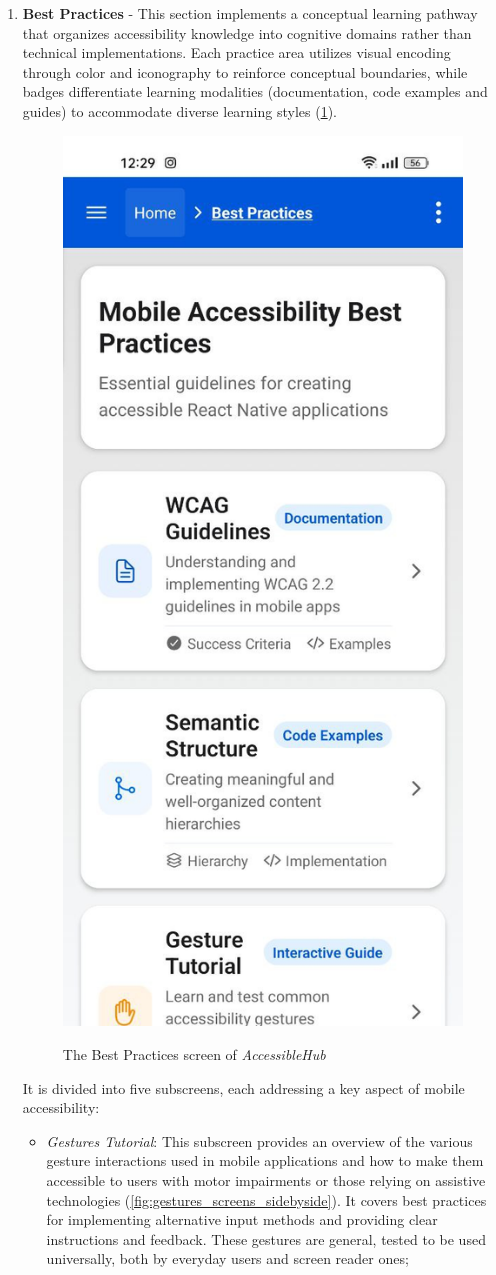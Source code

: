 \begin{enumerate}
\begin{itemize}
    \FloatBarrier
        
    \end{itemize}

\item \textbf{Best Practices} - This section implements a conceptual learning pathway that organizes accessibility knowledge into cognitive domains rather than technical implementations. Each practice area utilizes visual encoding through color and iconography to reinforce conceptual boundaries, while badges differentiate learning modalities (documentation, code examples and guides) to accommodate diverse learning styles (\ref{fig:best-practices}).

\begin{figure}[ht]
\centering
\includegraphics[width=0.4\linewidth, alt={Screenshot of the Best Practices screen of AccessibleHub}]{img/best-practices.jpg}
\caption{The Best Practices screen of \textit{AccessibleHub}}\label{fig:best-practices}
\end{figure}

\pagebreak

It is divided into five subscreens, each addressing a key aspect of mobile accessibility:

    \begin{itemize}
        \item \textit{Gestures Tutorial}: This subscreen provides an overview of the various gesture interactions used in mobile applications and how to make them accessible to users with motor impairments or those relying on assistive technologies (\ref{fig:gestures_screens_sidebyside}). It covers best practices for implementing alternative input methods and providing clear instructions and feedback. These gestures are general, tested to be used universally, both by everyday users and screen reader ones;


\end{itemize}
\end{enumerate}

